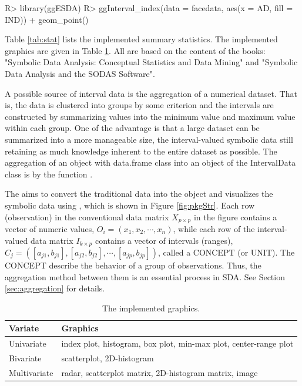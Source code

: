 \documentclass[article]{jss}
\newcommand{\fct}[1]{\code{#1()}}
\begin{document}
\begin{CodeChunk}
\begin{CodeInput}
R> library(ggESDA)
R> ggInterval_index(data = facedata, aes(x = AD, fill = IND)) +
         geom_point()
\end{CodeInput}
\end{CodeChunk}

Table \ref{tab:stat} lists the implemented summary statistics.
The implemented graphics are given in Table \ref{tab:graphics}.
All are based on the content of the books:
"Symbolic Data Analysis: Conceptual Statistics and Data Mining"
and
"Symbolic Data Analysis and the SODAS Software".


A possible source of interval data is the aggregation of a numerical
dataset. That is, the data is clustered into groups by some criterion
and the intervals are constructed by summarizing values into the
minimum value and maximum value within each group. One of the
advantage is that a large dataset can be summarized into a more
manageable size, the interval-valued symbolic data still retaining as
much knowledge inherent to the entire dataset as possible. The
aggregation of an object with data.frame class into an object of the
IntervalData class is by the function \fct{classic2sym()}.

The 
aims to convert the traditional data into the  object and
visualizes the symbolic data using , which is shown in
Figure \ref{fig:pkgStr}. Each row (observation) in the conventional
data matrix $X_{p \times p}$ in the figure contains a vector of
numeric values, $O_i = (x_1,x_2,\cdots,x_n)$, while each row of the
interval-valued data matrix $I_{k \times p}$ contains a vector of
intervals (ranges), $C_j =
([a_{j1},b_{j1}],[a_{j2},b_{j2}],\cdots,[a_{jp},b_{jp}])$, called a
CONCEPT (or UNIT). The CONCEPT describe the behavior of a group of
observations. Thus, the aggregation method between them is an
essential process in SDA. See Section \ref{sec:aggregation} for details.



\begin{table}[t!]
\centering
\begin{tabular}{|l|l|} \hline
Variate          & Graphics    \\ \hline
Univariate  & index plot, histogram, box plot, min-max plot, center-range plot \\ \hline
Bivariate & scatterplot, 2D-histogram \\ \hline
Multivariate & radar, scatterplot matrix, 2D-histogram matrix, image\\ \hline
\end{tabular}
\caption{\label{tab:graphics} The implemented graphics.}
\end{table}
\end{document}
